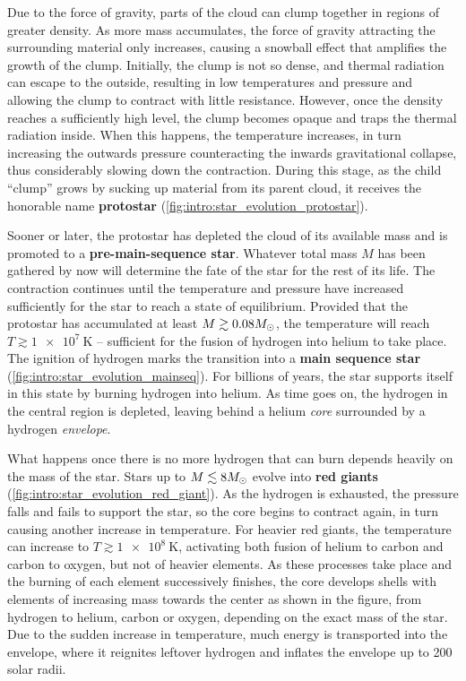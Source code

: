 Due to the force of gravity, parts of the cloud can clump together in regions of greater density.
As more mass accumulates, the force of gravity attracting the surrounding material only increases, causing a snowball effect that amplifies the growth of the clump.
Initially, the clump is not so dense, and thermal radiation can escape to the outside, resulting in low temperatures and pressure and allowing the clump to contract with little resistance.
However, once the density reaches a sufficiently high level, the clump becomes opaque and traps the thermal radiation inside.
When this happens, the temperature increases, in turn increasing the outwards pressure counteracting the inwards gravitational collapse, thus considerably slowing down the contraction.
During this stage, as the child ``clump'' grows by sucking up material from its parent cloud, it receives the honorable name \textbf{protostar} (\cref{fig:intro:star_evolution_protostar}).

Sooner or later, the protostar has depleted the cloud of its available mass and is promoted to a \textbf{pre-main-sequence star}.
Whatever total mass $M$ has been gathered by now will determine the fate of the star for the rest of its life.
The contraction continues until the temperature and pressure have increased sufficiently for the star to reach a state of equilibrium.
Provided that the protostar has accumulated at least $M \gtrsim 0.08 M_\odot$, the temperature will reach $T \gtrsim \SI{1e7}{\kelvin}$ -- sufficient for the fusion of hydrogen into helium to take place.
The ignition of hydrogen marks the transition into a \textbf{main sequence star} (\cref{fig:intro:star_evolution_mainseq}).
For billions of years, the star supports itself in this state by burning hydrogen into helium.
As time goes on, the hydrogen in the central region is depleted, leaving behind a helium \emph{core} surrounded by a hydrogen \emph{envelope}.

What happens once there is no more hydrogen that can burn depends heavily on the mass of the star.
Stars up to $M \lesssim 8 M_\odot$ evolve into \textbf{red giants} (\cref{fig:intro:star_evolution_red_giant}).
As the hydrogen is exhausted, the pressure falls and fails to support the star, so the core begins to contract again, in turn causing another increase in temperature.
For heavier red giants, the temperature can increase to $T \gtrsim \SI{1e8}{\kelvin}$, activating both fusion of helium to carbon and carbon to oxygen, but not of heavier elements.
As these processes take place and the burning of each element successively finishes, the core develops shells with elements of increasing mass towards the center as shown in the figure, from hydrogen to helium, carbon or oxygen, depending on the exact mass of the star.
Due to the sudden increase in temperature, much energy is transported into the envelope, where it reignites leftover hydrogen and inflates the envelope up to 200 solar radii.

